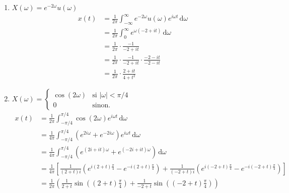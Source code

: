 \begin{solution}
    \text{ }
        
    \begin{enumerate}[label=(\alph*)]
        \item 
        $
        X(\omega) = e^{-2\omega}u(\omega)
        $
        \[
        \begin{aligned}
            x(t) &= \frac{1}{2\pi} \int_{-\infty}^{\infty} e^{-2\omega} u(\omega) e^{i\omega t} \, \mathrm{d}\omega \\
                 &= \frac{1}{2\pi} \int_{0}^{\infty} e^{\omega (-2 + it)} \, \mathrm{d}\omega \\
                 &= \frac{1}{2\pi} \cdot \frac{-1}{-2 + it} \\
                 &= \frac{1}{2\pi} \cdot \frac{-1}{-2 + it} \cdot \frac{-2 - it}{-2 - it} \\
                 &= \frac{1}{2\pi} \cdot \frac{2 + it}{4 + t^2}
        \end{aligned}
        \]
    
        \item 
        $
        X(\omega) = 
        \begin{cases}
            \cos(2\omega) & \text{si } |\omega| < \pi/4 \\
            0 & \text{sinon}.
        \end{cases}
        $
        \[
        \begin{aligned}
            x(t) &= \frac{1}{2\pi} \int_{-\pi/4}^{\pi/4} \cos(2\omega) e^{i\omega t} \, \mathrm{d}\omega \\
                 &= \frac{1}{4\pi} \int_{-\pi/4}^{\pi/4} (e^{2i\omega} + e^{-2i\omega}) e^{i\omega t} \, \mathrm{d}\omega \\
                 &= \frac{1}{4\pi} \int_{-\pi/4}^{\pi/4} \left( e^{(2i + it)\omega} + e^{(-2i + it)\omega} \right) \, \mathrm{d}\omega \\
                 &= \frac{1}{4\pi} \left[ \frac{1}{(2 + t)i} \left( e^{i(2 + t)\frac{\pi}{4}} - e^{-i(2 + t)\frac{\pi}{4}} \right) + \frac{1}{(-2 + t)i} \left( e^{i(-2 + t)\frac{\pi}{4}} - e^{-i(-2 + t)\frac{\pi}{4}} \right) \right] \\
                 &= \frac{1}{2\pi} \left( \frac{1}{2 + t} \sin\left((2 + t)\frac{\pi}{4}\right) + \frac{1}{-2 + t} \sin\left((-2 + t)\frac{\pi}{4}\right) \right)
        \end{aligned}
        \]
    

\end{enumerate}
\end{solution}
